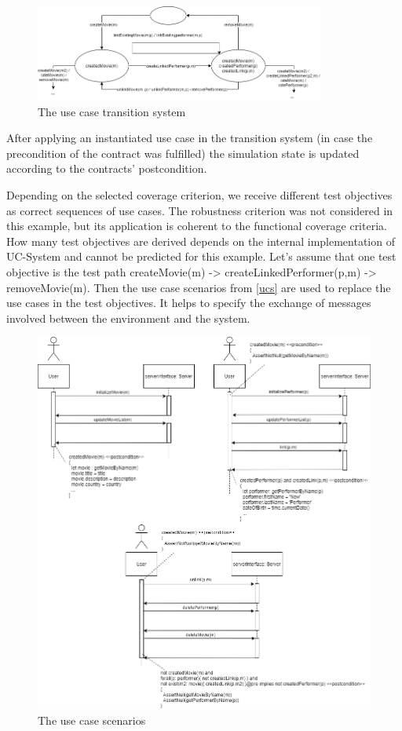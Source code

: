 \begin{figure}[h]
	\centering
	\includegraphics[width=0.85\textwidth]{./images/ucts.png}
	\caption{The use case transition system}
	\label{ucts}
\end{figure}

After applying an instantiated use case in the transition system (in case the precondition of the contract was fulfilled) the simulation state is updated according to the contracts' postcondition. 

Depending on the selected coverage criterion, we receive different test objectives as correct sequences of use cases. The robustness criterion was not considered in this example, but its application is coherent to the functional coverage criteria. How many test objectives are derived depends on the internal implementation of UC-System and cannot be predicted for this example. Let's assume that one test objective is the test path createMovie(m) \mbox{-\textgreater} createLinkedPerformer(p,m) \mbox{-\textgreater} removeMovie(m). Then the use case scenarios from \autoref{ucs} are used to replace the use cases in the test objectives. It helps to specify the exchange of messages involved between the environment and the system.

\begin{figure}[h]
	\centering
	\includegraphics[width=1.0\textwidth]{./images/ucs.png}
	\caption{The use case scenarios}
	\label{ucs}
\end{figure}

